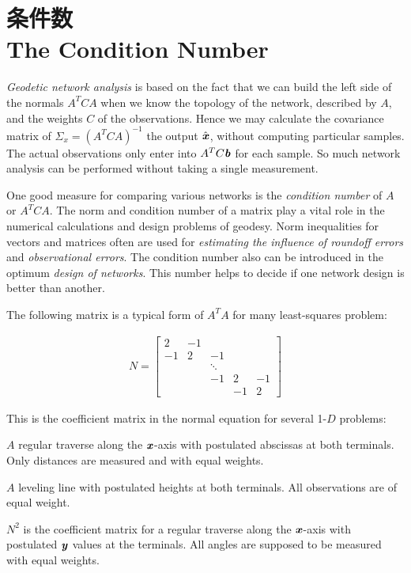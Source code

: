 \section[条件数]{条件数\\The Condition Number}
\begin{flushleft}
	\textit{Geodetic network analysis} is based on the fact that we can build the left side of the normals $A^{T}CA$ when we know the topology of the network, described by $A$, and the weights $C$ of the observations. Hence we may calculate the covariance matrix of $ \Sigma_{x}=(A^{T}CA)^{-1} $ the output $\hat{\textbf{\textit{x}}}$, without computing particular samples. The actual observations only enter into $A^{T}C\textbf{\textit{b}}$ for each sample. So much network analysis can be performed without taking a single measurement.
\end{flushleft}
One good measure for comparing various networks is the \textit{condition number} of $A$ or $A^{T}CA$. The norm and condition number of a matrix play a vital role in the numerical calculations and design problems of geodesy. Norm inequalities for vectors and matrices often are used for \textit{estimating the influence of roundoff errors} and \textit{observational errors}. The condition number also can be introduced in the optimum \textit{design of networks}. This number helps to decide if one network design is better than another. 

The following matrix is a typical form of $A^{T}A$ for many least-squares problem: 

\begin{align*}
N=
\begin{bmatrix}
 2     & -1          &        &        & \\
-1     &  2      &  -1        &        & \\
 &        &       \ddots      &        & \\
 &        &         -1     &  2     & -1 \\
 &        &          &       -1     &  2
\end{bmatrix}
\end{align*}  
\begin{flushleft}
	This is the coefficient matrix in the normal equation for several 1-$D$ problems:
\end{flushleft} 
\begin{adjustwidth}{2em}{2em}
	$A$ regular traverse along the $\textbf{\textit{x}}$-axis with postulated abscissas at both terminals. Only distances are measured and with equal weights.
\end{adjustwidth}
\begin{adjustwidth}{2em}{2em}
	$A$ leveling line with postulated heights at both terminals. All observations are of equal weight.
\end{adjustwidth}
\begin{adjustwidth}{2em}{2em}
	$N^{2}$ is the coefficient matrix for a regular traverse along the $\textbf{\textit{x}}$-axis with postulated $\textbf{\textit{y}}$ values at the terminals. All angles are supposed to be measured with equal weights.
\end{adjustwidth}

